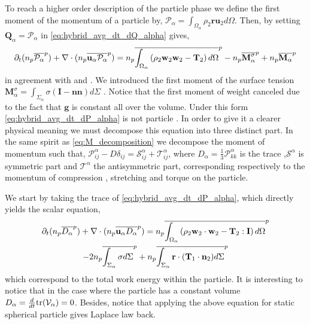 To reach a higher order description of the particle phase we define the first moment of the momentum of a particle by, $\mathcal{P}_\alpha = \int_{\Omega_\alpha} \rho_2 \textbf{r} \textbf{u}_2 d\Omega$.
Then, by setting $\textbf{Q}_\alpha = \mathcal{P}_\alpha$ in \ref{eq:hybrid_avg_dt_dQ_alpha} gives,
\begin{multline}
    \partial_t (n_p\overline{\mathcal{P}_\alpha}^{p})
    + \mathbf{\nabla}\cdot (n_p\overline{  \textbf{u}_\alpha \mathcal{P}_\alpha}^{p})
    = n_p\overline{\int_{\Omega_\alpha} \left(
        \rho_2 \textbf{w}_2 \textbf{w}_2
        - \mathbf{T}_2
        \right) d\Omega}^{p}
        - n_p\overline{\textbf{M}_\alpha^\sigma}^{p}
        + n_p\overline{\textbf{M}_\alpha}^{p}
    \label{eq:hybrid_avg_dt_dP_alpha}
\end{multline}
in agreement with \citet[Appendix C]{morel2015mathematical} and \citet[chapter 1]{zaepffel2011modelisation}.
We introduced the first moment of the surface tension $\textbf{M}_\alpha^\sigma = \int_{\Sigma_\alpha} \sigma (\textbf{I} - \textbf{nn}) d\Sigma$ .
Notice that the first moment of weight canceled due to the fact that $\textbf{g}$ is constant all over the volume. 
Under this form \ref{eq:hybrid_avg_dt_dP_alpha} is not particle . 
In order to give it a clearer physical meaning we must decompose this equation into three distinct part. 
In the same spirit as \ref{eq:M_decomposition} we decompose the moment of momentum such that, $\mathcal{P}^\alpha_{ij} - D\delta_{ij} = \mathcal{S}^\alpha_{ij}+\mathcal{T}^\alpha_{ij}$, where $D_\alpha = \frac{1}{3}\mathcal{P}^\alpha_{kk}$ is the trace ,$\mathcal{S}^\alpha$ is symmetric part and $\mathcal{T}^\alpha$ the antisymmetric part, corresponding respectively to the momentum of compression , stretching and torque on the particle. 

We start by taking the trace of \ref{eq:hybrid_avg_dt_dP_alpha}, which directly yields the scalar equation, 
\begin{multline}
    \partial_t (n_p\overline{D_\alpha}^{p})
    + \mathbf{\nabla}\cdot (n_p\overline{  \textbf{u}_\alpha D_\alpha}^{p})
    = n_p\overline{\int_{\Omega_\alpha} \left(
        \rho_2 \textbf{w}_2 \cdot \textbf{w}_2
        - \mathbf{T}_2 : \textbf{I}
        \right) d\Omega}^{p}\\
        - 2n_p\overline{\int_{\Sigma_\alpha} \sigma d\Sigma}^{p}
        + n_p\overline{\int_{\Sigma_\alpha} \textbf{r}\cdot(\textbf{T}_1\cdot\textbf{n}_2) d\Sigma}^{p}
    \label{eq:hybrid_avg_dt_dD_alpha}
\end{multline}
which correspond to the total work energy within the particle. 
It is interesting to notice that in the case where the particle has a constant volume $D_\alpha = \frac{d}{d t} \text{tr}(\mathcal{V}_\alpha)  = 0$. 
Besides, notice that applying the above equation for static spherical particle gives Laplace law back. 




